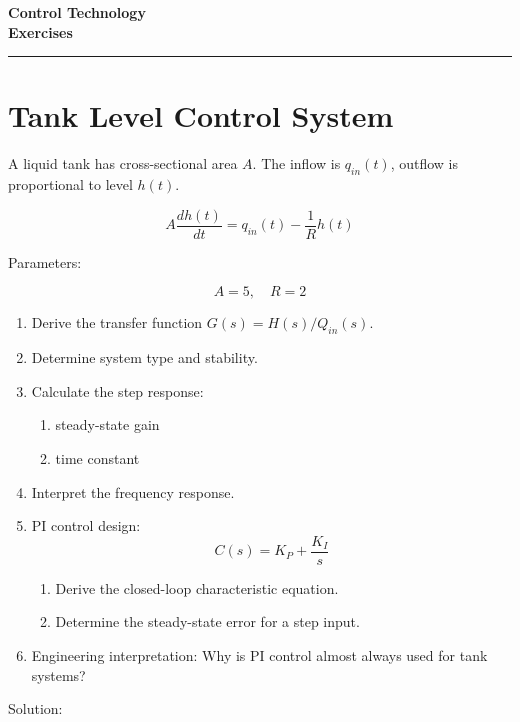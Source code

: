 \documentclass[a4paper,12pt]{article}
\newif\ifshowsolutions
\begin{document}
\begin{center}
  {\LARGE\bfseries Control Technology \\[6pt] Exercises}\\[12pt]
  \rule{\textwidth}{0.4pt}
\end{center}


\section{Tank Level Control System}

A liquid tank has cross-sectional area $A$. The inflow is $q_{in}(t)$, outflow is proportional to level $h(t)$.

\[
A\frac{dh(t)}{dt} = q_{in}(t) - \frac{1}{R}h(t)
\]

Parameters:

\[
A=5,\quad R=2
\]

\begin{enumerate}

\item[(a)] Derive the transfer function $G(s)=H(s)/Q_{in}(s)$.

\item[(b)] Determine system type and stability.

\item[(c)] Calculate the step response:
\begin{enumerate}
\item[(i)] steady-state gain
\item[(ii)] time constant
\end{enumerate}

\item[(d)] Interpret the frequency response.

\item[(e)] PI control design:
\[
C(s)=K_P+\frac{K_I}{s}
\]
\begin{enumerate}
\item[(i)] Derive the closed-loop characteristic equation.
\item[(ii)] Determine the steady-state error for a step input.
\end{enumerate}

\item[(f)] Engineering interpretation:
Why is PI control almost always used for tank systems?

\end{enumerate}

\ifshowsolutions
Solution:
\end{document}
